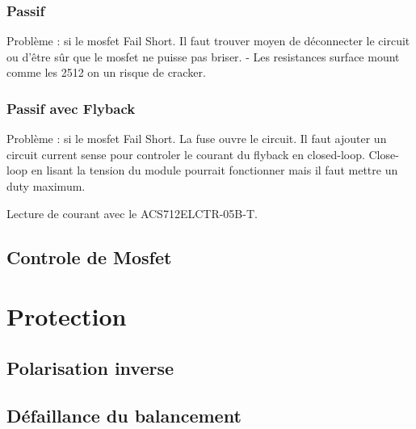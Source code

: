 \documentclass[12pt,letterpaper]{article}
\begin{document}
\begin{normalsize}
			\subsubsection{Passif}
			Probl\`{e}me : si le mosfet Fail Short. Il faut trouver moyen de d\'{e}connecter le circuit ou d'\^{e}tre s\^{u}r que le mosfet ne puisse pas briser.
			- Les resistances surface mount comme les 2512 on un risque de cracker.
			\subsubsection{Passif avec Flyback}
			Probl\`{e}me : si le mosfet Fail Short. La fuse ouvre le circuit. Il faut ajouter un circuit current sense pour controler le courant du flyback en closed-loop. Close-loop en lisant la tension du module pourrait fonctionner mais il faut mettre un duty maximum.
			
			Lecture de courant avec le ACS712ELCTR-05B-T. 
			
			\subsection{Controle de Mosfet}
			
			
		
		\section{Protection}
			\subsection{Polarisation inverse}
			
			\subsection{D\'{e}faillance du balancement}
					
					
			
					
	\end{normalsize}
\end{document}
